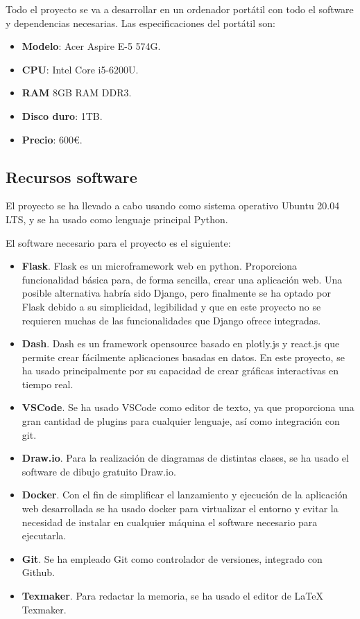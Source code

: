 Todo el proyecto se va a desarrollar en un ordenador portátil con todo el software y dependencias necesarias. Las especificaciones del portátil son:

\begin{itemize}
\item \textbf{Modelo}: Acer Aspire E-5 574G.
\item \textbf{CPU}: Intel Core i5-6200U.
\item \textbf{RAM} 8GB RAM DDR3.
\item \textbf{Disco duro}: 1TB.
\item \textbf{Precio}: 600€.
\end{itemize}

\subsection{Recursos software}

El proyecto se ha llevado a cabo usando como sistema operativo Ubuntu 20.04 LTS, y se ha usado como lenguaje principal Python.

El software necesario para el proyecto es el siguiente:

\begin{itemize}
\item \textbf{Flask}. Flask es un microframework web en python. Proporciona funcionalidad básica para, de forma sencilla, crear una aplicación web. Una posible alternativa habría sido Django, pero finalmente se ha optado por Flask debido a su simplicidad, legibilidad y que en este proyecto no se requieren muchas de las funcionalidades que Django ofrece integradas. 
\item \textbf{Dash}. Dash es un framework opensource basado en plotly.js y react.js que permite crear fácilmente aplicaciones basadas en datos. En este proyecto, se ha usado principalmente por su capacidad de crear gráficas interactivas en tiempo real. 
\item \textbf{VSCode}. Se ha usado VSCode como editor de texto, ya que proporciona una gran cantidad de plugins para cualquier lenguaje, así como integración con git.
\item \textbf{Draw.io}. Para la realización de diagramas de distintas clases, se ha usado el software de dibujo gratuito Draw.io.
\item \textbf{Docker}. Con el fin de simplificar el lanzamiento y ejecución de la aplicación web desarrollada se ha usado docker para virtualizar el entorno y evitar la necesidad de instalar en cualquier máquina el software necesario para ejecutarla.
\item \textbf{Git}. Se ha empleado Git como controlador de versiones, integrado con Github.
\item \textbf{Texmaker}. Para redactar la memoria, se ha usado el editor de LaTeX Texmaker.
\end{itemize}

